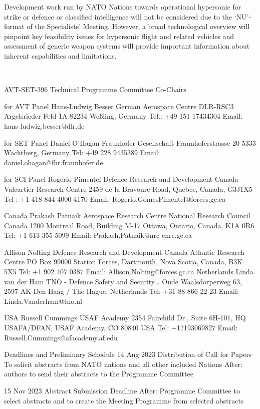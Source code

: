 Development work run by NATO Nations towards operational hypersonic for strike or defence or classified intelligence will not be considered due to the ‘NU’- format of the Specialists’ Meeting. However, a broad technological overview will pinpoint key feasibility issues for hypersonic flight and related vehicles and assessment of generic weapon systems will provide important information about inherent capabilities and limitations.


 

AVT-SET-396 Technical Programme Committee 
Co-Chairs

for AVT Panel
Hans-Ludwig Besser
German Aerospace Centre DLR-RSC3
Argelsrieder Feld 1A
82234 Weßling, Germany
Tel.: +49 151 17434304 
Email: hans-ludwig.besser@dlr.de

for SET Panel
Daniel O’Hagan
Fraunhofer Gesellschaft
Fraunhoferstrasse 20
5333 Wachtberg, Germany
Tel: +49 228 9435389 
Email: daniel.ohagan@fhr.fraunhofer.de

for SCI Panel
Rogerio Pimentel
Defence Research and Development Canada
Valcartier Research Centre
2459 de la Bravoure Road,
Quebec, Canada, G3J1X5
Tel : +1 418 844 4000 4170
			     Email: Rogerio.GomesPimentel@forces.gc.ca

Canada
Prakash Patnaik
Aerospace Research Centre
National Research Council Canada
1200 Montreal Road, Building M-17
Ottawa, Ontario, Canada, K1A 0R6
Tel: +1 613-355-5099
Email: Prakash.Patnaik@nrc-cnrc.gc.ca

Allison Nolting
Defence Research and Development Canada
Atlantic Research Centre
PO Box 99000 Station Forces,
Dartmouth, Nova Scotia, Canada, B3K 5X5
Tel: +1 902 407 0387
Email: Allison.Nolting@forces.gc.ca
	Netherlands
Linda van der Ham
TNO - Defence Safety and Security…
Oude Waalsdorperweg 63, 
2597 AK Den Haag / The Hague, Netherlands
Tel: +31 88 866 22 23
Email: Linda.Vanderham@tno.nl

USA
Russell Cummings
USAF Academy 
2354 Fairchild Dr., Suite 6H-101, HQ USAFA/DFAN, USAF Academy, CO 80840
USA
Tel: +17193069827
Email: Russell.Cummings@afacademy.af.edu

Deadlines and Preliminary Schedule
14 Aug 2023
	Distribution of Call for Papers
To solicit abstracts from NATO nations and all other included Nations
After: authors to send their abstracts to the Programme Committee

15 Nov 2023	Abstract Submission Deadline 
After: Programme Committee to select abstracts and to create the Meeting Programme from selected abstracts

